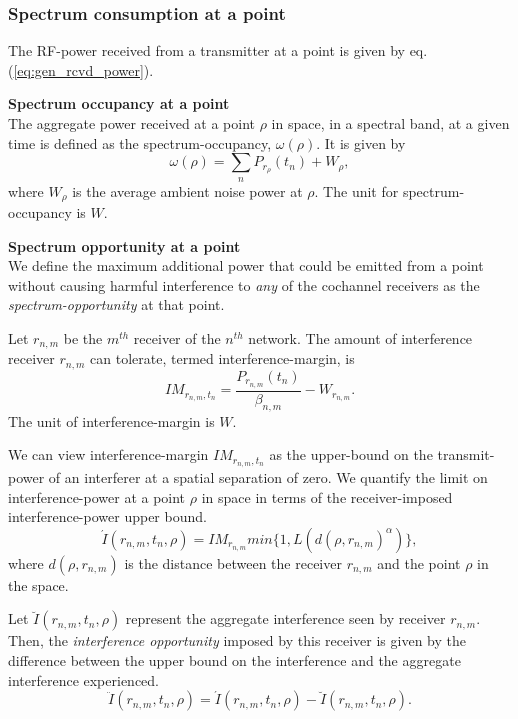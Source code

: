 \documentclass[journal,12pt,draftclsnofoot,onecolumn]{IEEEtran}
\begin{document}
\subsubsection{Spectrum consumption at a point}
The RF-power received from a transmitter at a point is given by eq.(\ref{eq:gen_rcvd_power}).

\noindent
\textbf{Spectrum occupancy at a point} \\
The aggregate power received at a point $\rho$ in space, in a spectral band, at a given time is defined as the spectrum-occupancy, $\omega(\rho)$. It is given by
\begin{equation}
\label{eq:spocpt}
\omega(\rho) = \sum_{n}	P_{r_\rho}(t_n) + W_{\rho} ,
\end{equation}
where $W_{\rho}$ is the average ambient noise power at $\rho$. The unit for spectrum-occupancy is $W$.

\noindent
\textbf{Spectrum opportunity at a point} \\
We define the maximum additional power that could be emitted from a point without causing harmful interference to \textit{any} of the cochannel receivers as the \textit{spectrum-opportunity} at that point.

Let $r_{n,m}$ be the $m^{th}$ receiver of the $n^{th}$ network. The amount of interference receiver $r_{n,m}$ can tolerate, termed interference-margin, is 
\begin{equation}
IM_{r_{n,m}, t_n} = \frac{P_{r_{n,m}}(t_n)}{\beta_{n,m}} - W_{r_{n,m}} .
\end{equation}
The unit of interference-margin is $W$.

We can view interference-margin $IM_{r_{n,m}, t_n}$ as the upper-bound on the transmit-power of an interferer at a spatial separation of zero. We quantify the limit on interference-power at a point $\rho$ in space in terms of the receiver-imposed interference-power upper bound.
\begin{equation}
\label{eq:riub}
\acute{I}(r_{n,m}, t_n, \rho) = IM_{r_{n,m}} min\{1, L(d(\rho, r_{n,m})^{\alpha})\} ,
\end{equation}
where $d(\rho, r_{n,m})$ is the distance between the receiver $r_{n,m}$ and the point $\rho$ in the space. 

Let $\breve{I}(r_{n,m}, t_n, \rho)$ represent the aggregate interference seen by receiver $r_{n,m}$. Then, the \textit{interference opportunity} imposed by this receiver is given by the difference between the upper bound on the interference and the aggregate interference experienced.
\begin{equation}
\label{eq:spoppt}
\ddot{I}(r_{n,m}, t_n, \rho) = \acute{I}(r_{n,m}, t_n, \rho) -  \breve{I}(r_{n,m}, t_n, \rho) .
\end{equation}
\end{document}
